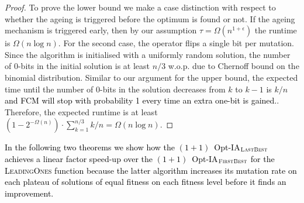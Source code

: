 \documentclass[lettersize,journal]{IEEEtran}
\newcommand{\new}[1]{\textcolor{black}{#1}}
\begin{document}
\begin{proof}
To prove the lower bound we make a case distinction with respect to whether the ageing is triggered before the optimum is found or not. If the ageing mechanism is triggered early, then by our assumption $\tau=\Omega(n^{1+\epsilon})$ the runtime is $\Omega(n \log n)$. For the second case, the operator flips a single bit per mutation. Since the algorithm is initialised with a uniformly random solution, the number of $0$-bits in the initial solution is at least $n/3$ w.o.p. due to Chernoff bound on the binomial distribution. Similar to our argument for the upper bound, the expected time until the number of $0$-bits in the solution decreases from $k$ to $k-1$ is $k/n$ \new{and FCM will stop with probability 1 every time an extra one-bit is gained.}. Therefore, the expected runtime is  at least $(1-2^{-\Omega(n)}) \cdot \sum_{k=1}^{n/3} k/n = \Omega(n \log n)$. 
\end{proof}

\new{In the following two theorems we show how the $(1+1)$~Opt-IA$_{\textsc{LastBest}}$ achieves a linear factor speed-up over the $(1+1)$~Opt-IA$_{\textsc{FirstBest}}$ for the \textsc{LeadingOnes} function because the latter algorithm increases its mutation rate on each plateau of solutions of equal fitness on each fitness level before it finds an improvement.}
\end{document}
